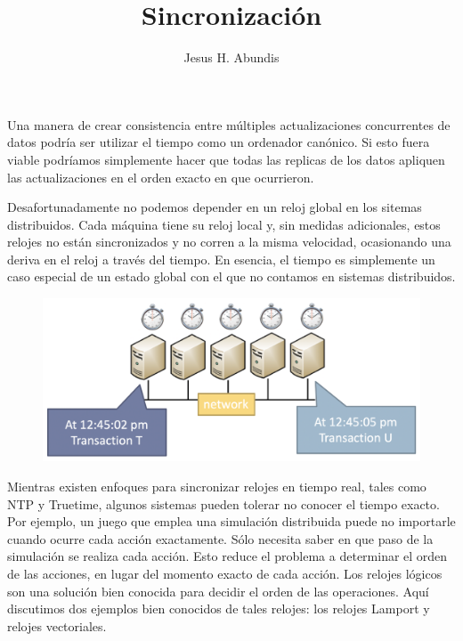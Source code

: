 \documentclass[12pt]{article}
\begin{document}
\title{Sincronización}
\author{Jesus H. Abundis}
\maketitle
\thispagestyle{empty}

\vspace{10pt}
Una manera de crear consistencia entre múltiples actualizaciones concurrentes de datos podría ser utilizar el tiempo como un ordenador canónico.
Si esto fuera viable podríamos simplemente hacer que todas las replicas de los datos apliquen las actualizaciones en el orden exacto en que ocurrieron.

Desafortunadamente no podemos depender en un reloj global en los sitemas distribuidos. 
Cada máquina tiene su reloj local y, 
sin medidas adicionales,
estos relojes no están sincronizados y no corren a la misma velocidad,
ocasionando una deriva en el reloj a través del tiempo.
En esencia, 
el tiempo es simplemente un caso especial de un estado global con el que no contamos en sistemas distribuidos.

\begin{figure}[h]
   \centering
   \includegraphics[scale=0.5]{red_distribuida.png}
\end{figure}

Mientras existen enfoques para sincronizar relojes en tiempo real, 
tales como NTP y Truetime, 
algunos sistemas pueden tolerar no conocer el tiempo exacto.
Por ejemplo,
un juego que emplea una simulación distribuida puede no importarle cuando ocurre cada acción exactamente.
Sólo necesita saber en que paso de la simulación se realiza cada acción.
Esto reduce el problema a determinar el orden de las acciones,
en lugar del momento exacto de cada acción.
Los relojes lógicos son una solución bien conocida para decidir el orden de las operaciones. 
Aquí discutimos dos ejemplos bien conocidos de tales relojes:
los relojes Lamport y relojes vectoriales.
\end{document}

